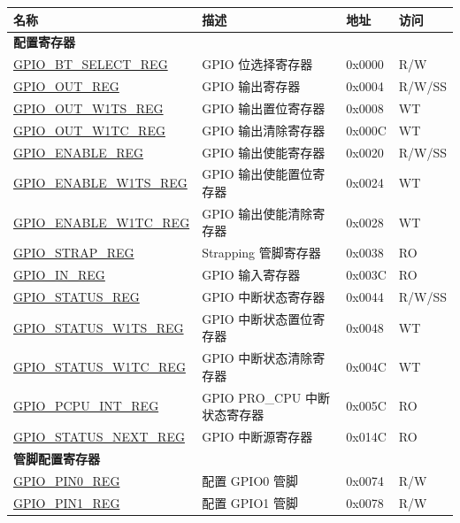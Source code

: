\begin{longtable}{ | p{6cm} | p{6.7cm} | p{1.3cm} | p{1.5cm} | }
\hline\rowcolor{lightgray}
名称 & 描述 & 地址 & 访问 \\ \hline
\endhead
\multicolumn{4}{|l|}{\textbf{配置寄存器}} \\ \hline
\hyperref[regdesc:GPIOBTSELECTREG]{GPIO\_BT\_SELECT\_REG} & GPIO 位选择寄存器 & 0x0000 & R/W \\ \hline
\hyperref[regdesc:GPIOOUTREG]{GPIO\_OUT\_REG} & GPIO 输出寄存器 & 0x0004 & R/W/SS \\ \hline
\hyperref[regdesc:GPIOOUTW1TSREG]{GPIO\_OUT\_W1TS\_REG} & GPIO 输出置位寄存器 & 0x0008 & WT \\ \hline
\hyperref[regdesc:GPIOOUTW1TCREG]{GPIO\_OUT\_W1TC\_REG} & GPIO 输出清除寄存器 & 0x000C & WT \\ \hline
\hyperref[regdesc:GPIOENABLEREG]{GPIO\_ENABLE\_REG} & GPIO 输出使能寄存器 & 0x0020 & R/W/SS \\ \hline
\hyperref[regdesc:GPIOENABLEW1TSREG]{GPIO\_ENABLE\_W1TS\_REG} & GPIO 输出使能置位寄存器 & 0x0024 & WT \\ \hline
\hyperref[regdesc:GPIOENABLEW1TCREG]{GPIO\_ENABLE\_W1TC\_REG} & GPIO 输出使能清除寄存器 & 0x0028 & WT \\ \hline
\hyperref[regdesc:GPIOSTRAPREG]{GPIO\_STRAP\_REG} & Strapping 管脚寄存器 & 0x0038 & RO \\ \hline
\hyperref[regdesc:GPIOINREG]{GPIO\_IN\_REG} & GPIO 输入寄存器 & 0x003C & RO \\ \hline
\hyperref[regdesc:GPIOSTATUSREG]{GPIO\_STATUS\_REG} & GPIO 中断状态寄存器 & 0x0044 & R/W/SS \\ \hline
\hyperref[regdesc:GPIOSTATUSW1TSREG]{GPIO\_STATUS\_W1TS\_REG} & GPIO 中断状态置位寄存器 & 0x0048 & WT \\ \hline
\hyperref[regdesc:GPIOSTATUSW1TCREG]{GPIO\_STATUS\_W1TC\_REG} & GPIO 中断状态清除寄存器 & 0x004C & WT \\ \hline
\hyperref[regdesc:GPIOPCPUINTREG]{GPIO\_PCPU\_INT\_REG} & GPIO PRO\_CPU 中断状态寄存器 & 0x005C & RO \\ \hline
\hyperref[regdesc:GPIOSTATUSNEXTREG]{GPIO\_STATUS\_NEXT\_REG} & GPIO 中断源寄存器 & 0x014C & RO \\ \hline
\multicolumn{4}{|l|}{\textbf{管脚配置寄存器}} \\ \hline
\hyperref[regdesc:GPIOPINNREG]{GPIO\_PIN0\_REG} & 配置 GPIO0 管脚& 0x0074 & R/W \\ \hline
\hyperref[regdesc:GPIOPINNREG]{GPIO\_PIN1\_REG} & 配置 GPIO1 管脚& 0x0078 & R/W \\ \hline

\end{longtable}
